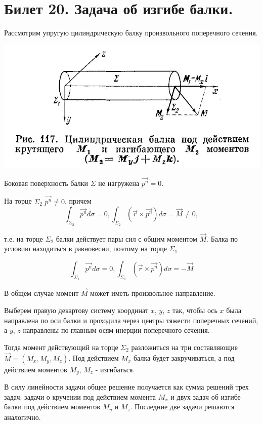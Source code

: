 \newpage
\section{Билет 20. Задача об изгибе балки.}

Рассмотрим упругую цилиндрическую балку произвольного поперечного сечения.

\includegraphics[scale=0.5]{20/t21_1.jpg}


\noindent Боковая поверхность балки $\Sigma$ не нагружена $\vec{p^n} = 0$.

\noindent На торце $\Sigma_2$ $\vec{p^n} \neq 0$, причем
$$\int_{\Sigma_2} {\vec{p^n} d{\sigma}} = 0,
\int_{\Sigma_2} (\vec{r} \times \vec{p^n}) d{\sigma} = \vec{M} \neq 0,$$

\noindent т.е. на торце $\Sigma_2$ балки действует пары сил с общим моментом $\vec{M}$. Балка по условию находиться в равновесии, поэтому на торце $\Sigma_1$

$$\int_{\Sigma_1} {\vec{p^n} d{\sigma}} = 0,
\int_{\Sigma_1} (\vec{r} \times \vec{p^n}) d{\sigma} = -\vec{M}$$

\noindent В общем случае момент $\vec{M}$ может иметь произвольное направление.

Выберем правую декартову систему координат $x$, $y$, $z$ так, чтобы ось $x$ была направлена по оси балки и проходила через центры тяжести поперечных сечений, а $y$, $z$ направлены по главным осям инерции поперечного сечения.

\noindent Тогда момент действующий на торце $\Sigma_2$ разложиться на три составляющие $\vec{M} = (M_x,M_y,M_z)$. Под действием $M_x$ балка будет закручиваться, а под действием моментов $M_y$, $M_z$ - изгибаться.

В силу линейности задачи общее решение получается как сумма решений трех задач: задачи о кручении под действием момента $M_x$ и двух задач об изгибе балки под действием моментов $M_y$ и $M_z$. Последние две задачи решаются аналогично.

